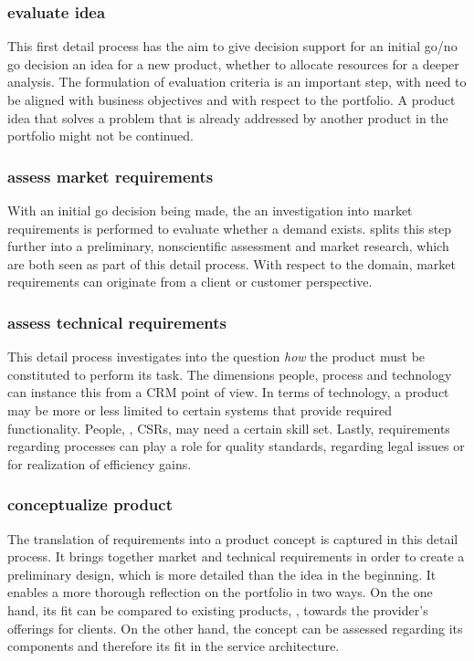 	\subsubsection{evaluate idea}
	This first detail process has the aim to give decision support for an initial go/no go decision \wrt an idea for a new product, \ie whether to allocate resources for a deeper analysis. The formulation of evaluation criteria is an important step, with need to be aligned with business objectives and with respect to the portfolio. A product idea that solves a problem that is already addressed by another product in the portfolio might not be continued. 
	\subsubsection{assess  market requirements}
	With an initial go decision being made, the an investigation into market requirements is performed to evaluate whether a demand exists. \citep{Edgett_1996} splits this step further into a preliminary, nonscientific assessment and market research, which are both seen as part of this detail process. With respect to the domain, market requirements can originate from a client or customer perspective. 
	\subsubsection{assess technical requirements}
	This detail process investigates into the question \textit{how} the product must be constituted to perform its task. The dimensions people, process and technology can instance this from a \acrshort{CRM} point of view. In terms of technology, a product may be more or less limited to certain systems that provide required functionality. People, \ie, \acrshort{CSR}s, may need a certain skill set. Lastly, requirements regarding processes can play a role for quality standards, regarding legal issues or for realization of efficiency gains.

	\subsubsection{conceptualize product}
	The translation of requirements into a product concept is captured in this detail process. It brings together market  and technical requirements in order to create a preliminary design, which is more detailed than the idea in the beginning. It enables a more thorough reflection on the portfolio in two ways. On the one hand, its fit can be compared to existing products, \ie, towards the provider's offerings for clients. On the other hand, the concept can be assessed regarding its components and therefore its fit in the service architecture. 
	
